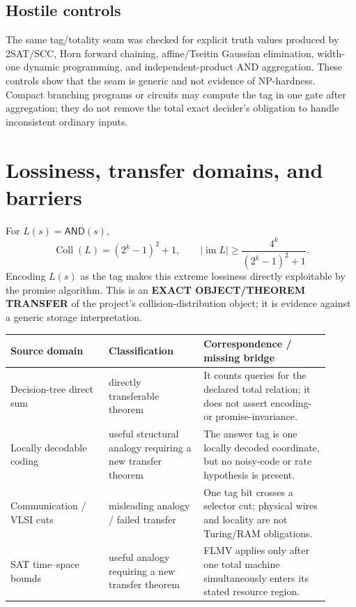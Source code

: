 \documentclass[11pt]{article}
\newcommand{\AND}{\mathsf{AND}}
\begin{document}
\subsection*{Hostile controls}
The same tag/totality seam was checked for explicit truth values produced by
2SAT/SCC, Horn forward chaining, affine/Tseitin Gaussian elimination,
width-one dynamic programming, and independent-product AND aggregation.
These controls show that the seam is generic and not evidence of NP-hardness.
Compact branching programs or circuits may compute the tag in one gate after
aggregation; they do not remove the total exact decider's obligation to handle
inconsistent ordinary inputs.

\section{Lossiness, transfer domains, and barriers}

For $L(s)=\AND(s)$,
\[
 \operatorname{Coll}(L)=(2^k-1)^2+1,
 \qquad
 |\operatorname{im}L|\ge\frac{4^k}{(2^k-1)^2+1}.
\]
Encoding $L(s)$ as the tag makes this extreme lossiness directly exploitable
by the promise algorithm.  This is an \textbf{EXACT OBJECT/THEOREM TRANSFER}
of the project's collision-distribution object; it is evidence against a
generic storage interpretation.

\begin{center}\small
\begin{tabular}{p{0.28\linewidth}p{0.27\linewidth}p{0.36\linewidth}}
\toprule
Source domain & Classification & Correspondence / missing bridge\\
\midrule
Decision-tree direct sum & directly transferable theorem & It counts queries
for the declared total relation; it does not assert encoding- or
promise-invariance.\\
Locally decodable coding & useful structural analogy requiring a new transfer
theorem & The answer tag is one locally decoded coordinate, but no noisy-code
or rate hypothesis is present.\\
Communication / VLSI cuts & misleading analogy / failed transfer & One tag bit
crosses a selector cut; physical wires and locality are not Turing/RAM
obligations.\\
SAT time--space bounds & useful analogy requiring a new transfer theorem &
FLMV applies only after one total machine simultaneously enters its stated
resource region.\\
\bottomrule
\end{tabular}
\end{center}
\end{document}
